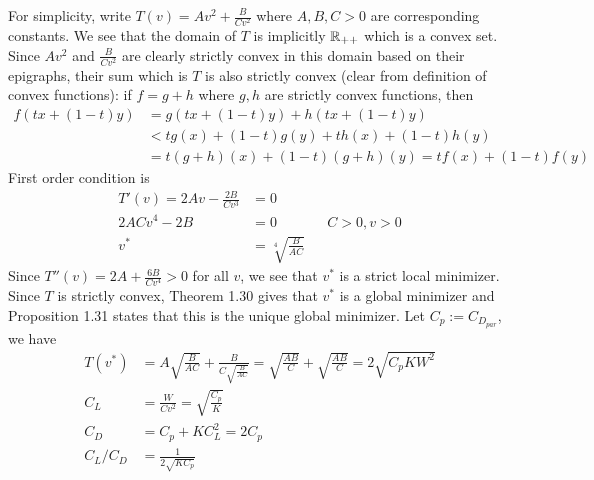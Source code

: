 \documentclass[12pt]{article}
\begin{document}
\begin{problem}[3]
For simplicity, write $ T(v) = Av^2+\frac{B}{Cv^2}$ where $ A,B,C>0$ are corresponding constants. We see that the domain of  $ T$ is implicitly  $ \mathbb{R}_{++}$ which is a convex set. Since $ Av^2$ and $ \frac{B}{Cv^2}$ are clearly strictly convex in this domain based on their epigraphs, their sum which is $ T$ is also strictly convex (clear from definition of convex functions): if $ f=g+h$ where $ g,h$ are strictly convex functions, then
 \begin{align*}
	 f(tx+(1-t)y) &= g(tx+(1-t)y)+ h(tx+(1-t)y)\\ 
		      &< tg(x)+(1-t)g(y)+ th(x)+(1-t)h(y)\\ 
		      &= t(g+h)(x) + (1-t)(g+h)(y) = tf(x)+(1-t)f(y)
\end{align*}
First order condition is
\begin{align*}
	T'(v) = 2Av-\frac{2B}{ Cv^3} &= 0 \\
	2ACv^{4} -2B &= 0 && C>0,v>0\\
	v^*  &= \sqrt[4]{\frac{B}{AC}}  
\end{align*}
Since $ T''(v) = 2A + \frac{6B}{Cv^{4} } >0$ for all $ v$, we see that  $ v^* $ is a strict local minimizer. Since $ T$ is strictly convex, Theorem 1.30 gives that  $ v^* $ is a global minimizer and Proposition 1.31 states that this is the unique global minimizer. Let $ C_p := C_{D_{par}}$, we have
\begin{align*}
	T(v^* ) &= A \sqrt{\frac{B}{AC}} + \frac{B}{C\sqrt{\frac{B}{AC}}  } = \sqrt{\frac{AB}{ C}} + \sqrt{\frac{AB}{ C}} = 2\sqrt{C_p K W^2}  \\
	C_L &= \frac{W}{Cv^2} = \sqrt{\frac{C_p}{ K}}  \\
	C_D &= C_p + KC_L^2 = 2 C_p \\
	C_L / C_D &= \frac{1}{2 \sqrt{K C_p} } 
\end{align*}
\end{problem}
\end{document}
